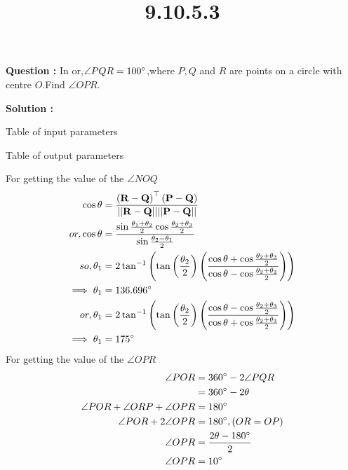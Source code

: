 \documentclass[12pt]{article}
\let\vec\mathbf
\providecommand{\brak}[1]{\ensuremath{\left(#1\right)}}
\providecommand{\norm}[1]{\ensuremath{\lvert|#1\rvert|}}
\begin{document}
\title{\textbf{9.10.5.3}}
\date{}
\maketitle
\textbf{Question :} In  or,$\angle PQR = 100\degree$,where $P,Q$ and $R$ are points on a circle with centre $O$.Find $\angle OPR$.

\textbf{Solution :}
\begin{table}[H]
    \centering
    
    \caption{Table of input parameters}
    \label{tab:tab:1}
\end{table}

\begin{table}[H]
    \centering
    
    \caption{Table of output parameters}
    \label{tab:tab:2}
\end{table}

For getting the value of the $\angle NOQ$
\begin{align}
    \cos{\theta}&=\frac{\brak{\vec{R-Q}}^{\top}\brak{\vec{P-Q}}}{\vec{\norm{R-Q}\norm{P-Q}}}\\
    or,\cos{\theta}&=\frac{\sin{\frac{\theta_1+\theta_2}{2}}\cos{\frac{\theta_2+\theta_3}{2}}}{\sin{\frac{\theta_2-\theta_1}{2}}}\\
    so,\theta_1&=2\tan^{-1}\brak{\tan\brak{{\frac{\theta_2}{2}}}\brak{\frac{\cos{\theta}+\cos{\frac{\theta_2+\theta_3}{2}}}{\cos{\theta}-\cos{\frac{\theta_2+\theta_3}{2}}}}}\\
    \implies \theta_1&=136.696\degree\\
    or,\theta_1&=2\tan^{-1}\brak{\tan\brak{{\frac{\theta_2}{2}}}\brak{\frac{\cos{\theta}-\cos{\frac{\theta_2+\theta_3}{2}}}{\cos{\theta}+\cos{\frac{\theta_2+\theta_3}{2}}}}}\\
    \implies \theta_1&=175\degree\\
\end{align}
For getting the value of the $\angle OPR$
\begin{align}
    \angle POR &=360\degree -2\angle PQR\\
    &=360\degree -2\theta \\
    \angle POR +\angle ORP +\angle OPR &= 180\degree\\
    \angle POR +2\angle OPR&= 180\degree, \brak{OR=OP}\\
\angle OPR &= \frac{2\theta-180\degree}{2}\\
 \angle OPR &=10\degree
 \end{align}
\end{document}
